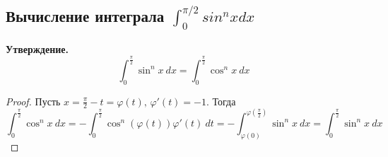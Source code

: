 \subsection{Вычисление интеграла $\int_{0}^{\pi/2} sin^n x dx$}
\textbf{Утверждение.}
\begin{equation*}
  \int_{0}^{\frac{\pi}{2}} \sin^n x \: dx =
  \int_{0}^{\frac{\pi}{2}} \cos^n x \: dx
\end{equation*}
\begin{proof}
    Пусть $x = \frac{\pi}{2} - t = \varphi(t), \, \varphi'(t) = -1$. Тогда
    \begin{equation*}
      \int_{0}^{\frac{\pi}{2}} \cos^n x \: dx = -\int_{0}^{\frac{\pi}{2}} \cos^n(\varphi(t))\varphi'(t) \: dt = -\int_{\varphi(0)}^{\varphi(\frac{\pi}{2})} \sin^n x\: dx =\int_{0}^{\frac{\pi}{2}} \sin^n x \: dx
    \end{equation*}
\end{proof}

